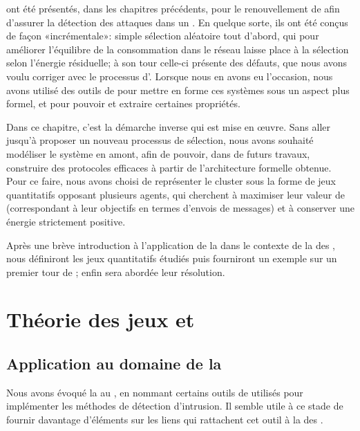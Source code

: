 \vfill
{} ont été présentés, dans les chapitres précédents, pour le renouvellement de \cns afin d'assurer la détection des attaques dans un \rcsfs.
En quelque sorte, ils ont été conçus de façon «incrémentale»: simple sélection aléatoire tout d'abord, qui pour améliorer l'équilibre de la consommation dans le réseau laisse place à la sélection selon l'énergie résiduelle; à son tour celle-ci présente des défauts, que nous avons voulu corriger avec le processus d'\elecdem.
Lorsque nous en avons eu l'occasion, nous avons utilisé des outils de  pour mettre en forme ces systèmes sous un aspect plus formel, et pour pouvoir et extraire certaines propriétés.

Dans ce chapitre, c'est la démarche inverse qui est mise en œuvre.
Sans aller jusqu'à proposer un nouveau processus de sélection, nous avons souhaité modéliser le système en amont, afin de pouvoir, dans de futurs travaux, construire des protocoles efficaces à partir de l'architecture formelle obtenue.
Pour ce faire, nous avons choisi de représenter le cluster sous la forme de jeux quantitatifs opposant plusieurs agents, qui cherchent à maximiser leur valeur de  (correspondant à leur objectifs en termes d'envois de messages) et à conserver une énergie strictement positive.

Après une brève introduction à l'application de la  dans le contexte de la \secu des \rcs, nous définiront les jeux quantitatifs étudiés puis fourniront un exemple sur un premier tour de ; enfin sera abordée leur résolution.
\pagebreak %

\section{Théorie des jeux et \rcs}

    \subsection{Application au domaine de la \secu}
Nous avons évoqué la  au , en nommant certains outils de  utilisés pour implémenter les méthodes de détection d'intrusion.
Il semble utile à ce stade de fournir davantage d'éléments sur les liens qui rattachent cet outil à la \secu des \rcsfs.

